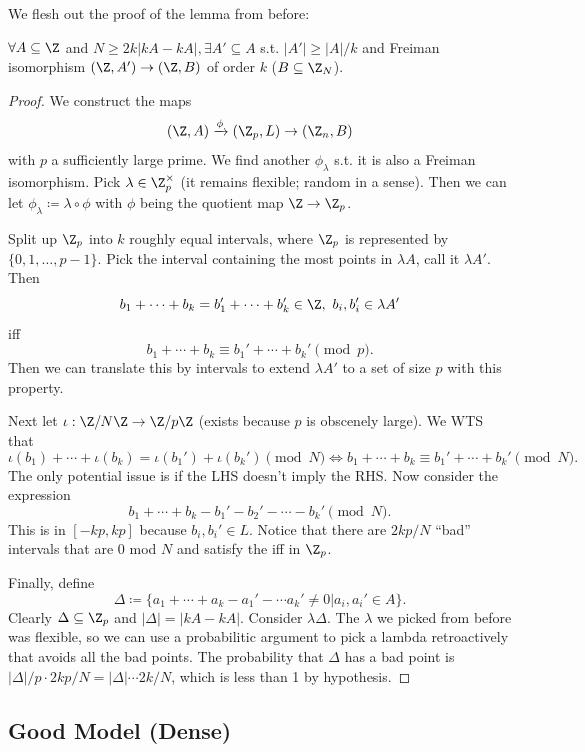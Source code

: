 \documentclass[a4paper]{article}
\begin{document}
We flesh out the proof of the lemma from before:
\begin{lem}
	$\forall A\subseteq \Z $ and $N \ge 2k|kA-kA|, \exists A'\subseteq A $ s.t. $|A'| \ge |A|/k $ and Freiman isomorphism $(\Z,A')\to (\Z,B) $ of order $k $ ($B \subseteq \Z_N $).
\end{lem}
\begin{proof}
	We construct the maps
	\[
		(\Z,A) \xrightarrow{\phi} (\Z_p,L) \to (\Z_n,B)
	\]
	with $p $ a sufficiently large prime.
	We find another $\phi_\lambda  $ s.t. it is also a Freiman isomorphism.
	Pick $\lambda \in \Z_p^{\times } $ (it remains flexible; random in a sense).
	Then we can let $\phi_\lambda \coloneqq  \lambda \circ \phi $ with $\phi $ being the quotient map $\Z\to \Z_p $.

	Split up $\Z_p $ into $k $ roughly equal intervals, where $\Z_p $ is represented by $\{0,1,\ldots ,p-1\}   $.
	Pick the interval containing the most points in $\lambda A $, call it $\lambda A' $.
	Then
	\[
		b_{1}+\cdots+b_k = b_{1}'+\cdots+b_k' \in \Z,\ b_i,b_i'\in \lambda A'
	\]
	iff
	\[
		b_{1}+\cdots+b_k \equiv b_{1}'+\cdots+b_k' \pmod{p}
	.\]
	Then we can translate this by intervals to extend $\lambda A' $ to a set of size $p $ with this property.

	Next let $\iota: \Z / N\Z \to \Z / p\Z $ (exists because $p $ is obscenely large).
	We WTS that
	\[
		\iota (b_{1})+\cdots+\iota (b_k) = \iota (b_{1}')+\iota (b_k') \pmod{N} \iff b_{1}+\cdots +b_k \equiv b_{1}'+\cdots +b_k' \pmod{N}
	.\]
	The only potential issue is if the LHS doesn't imply the RHS.
	Now consider the expression
	\[
		b_{1}+\cdots+b_k-b_{1}'-b_{2}'-\cdots-b_k' \pmod{N}
	.\]
	This is in $[-kp,kp] $ because $b_i,b_i' \in L $.
	Notice that there are $2kp / N $ ``bad'' intervals that are 0 mod $N $ and satisfy the iff in $\Z_p $.

	Finally, define
	\[
		\Delta \coloneqq  \{a_{1}+\cdots+a_k - a_{1}' - \cdots a_k' \ne 0 | a_i,a_i' \in A\}
	.\]
	Clearly $\Delta\subseteq \Z_p $ and $|\Delta| = |kA-kA| $.
	Consider $\lambda\Delta $.
	The $\lambda  $ we picked from before was flexible, so we can use a probabilitic argument to pick a lambda retroactively that avoids all the bad points.
	The probability that $\Delta $ has a bad point is $|\Delta|/p \cdot 2kp / N = |\Delta|\cdots 2k /N $, which is less than 1 by hypothesis.
\end{proof}

\subsection{Good Model (Dense)}
\end{document}
